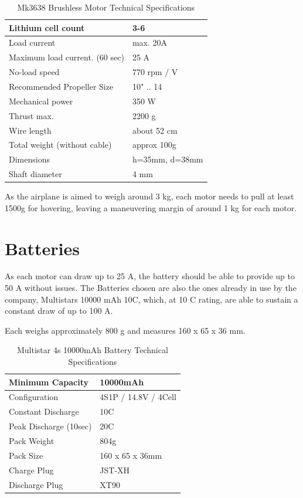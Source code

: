 \begin{table}[H]
\centering
\caption{Mk3638 Brushless Motor Technical Specifications}
\label{tab:mk3638}
\begin{tabular}{|l|l|}
\hline
Lithium cell count 					& 3-6 \\ \hline
Load current      					& max. 20A \\ \hline
Maximum load current. (60 sec)		& 25 A \\ \hline
No-load speed 						& 770 rpm / V \\ \hline
Recommended Propeller Size 			& 10" .. 14 \\ \hline
Mechanical power					& 350 W \\ \hline
Thrust max.							& 2200 g \\ \hline
Wire length							& about 52 cm \\ \hline
Total weight (without cable)		& approx 100g \\ \hline
Dimensions							& h=35mm, d=38mm \\ \hline
Shaft diameter						& 4 mm \\ \hline
\end{tabular}
\end{table}

As the airplane is aimed to weigh around 3 kg, each motor needs to pull at least 1500g for hovering, leaving a maneuvering margin of around 1 kg for each motor.

\section{Batteries}

As each motor can draw up to 25 A, the battery should be able to provide up to 50 A without issues.
The Batteries chosen are also the ones already in use by the company, Multistars 10000 mAh 10C, which, at 10 C rating, are able to sustain a constant draw of up to 100 A. 

Each weighs approximately 800 g and measures 160 x 65 x 36 mm.



\begin{table}[h]
\centering
\caption{Multistar 4s 10000mAh Battery Technical Specifications}
\label{tab:multistar}
\begin{tabular}{|l|l|}
\hline
Minimum Capacity		& 10000mAh \\ \hline
Configuration			& 4S1P / 14.8V / 4Cell \\ \hline
Constant Discharge		& 10C \\ \hline
Peak Discharge (10sec)	& 20C \\ \hline
Pack Weight				& 804g \\ \hline
Pack Size				& 160 x 65 x 36mm \\ \hline
Charge Plug				& JST-XH \\ \hline
Discharge Plug			& XT90 \\ \hline
\end{tabular}
\end{table}


